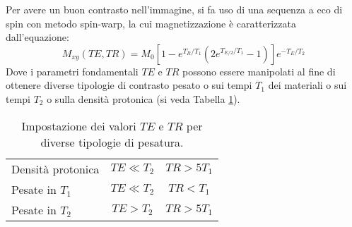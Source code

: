 Per avere un buon contrasto nell'immagine, si fa uso di una sequenza a eco di spin con metodo spin-warp, la cui magnetizzazione è caratterizzata dall'equazione:
\begin{equation}
	M_{xy}(TE,TR) = M_0[1-e^{T_R/T_1}(2e^{T_{E/2}/T_1}-1)]e^{-T_E/T_2}
\end{equation}
Dove i parametri fondamentali $TE$ e $TR$ possono essere manipolati al fine di ottenere diverse tipologie di contrasto pesato o sui tempi $T_1$ dei materiali o sui tempi $T_2$ o sulla densità protonica (si veda Tabella \ref{tab:peso}).

\begin{table}
\centering
\begin{tabular}{l|cc}
	\toprule
	Densità protonica & $TE \ll T_2$	& $TR > 5T_1$ \\
	Pesate in $T_1$   & $TE \ll T_2$	& $TR < T_1$ \\
	Pesate in $T_2$   & $TE > T_2$		& $TR > 5T_1$ \\
	\bottomrule
\end{tabular}
\caption{Impostazione dei valori $TE$ e $TR$ per diverse tipologie di pesatura.}
\label{tab:peso}
\end{table}
